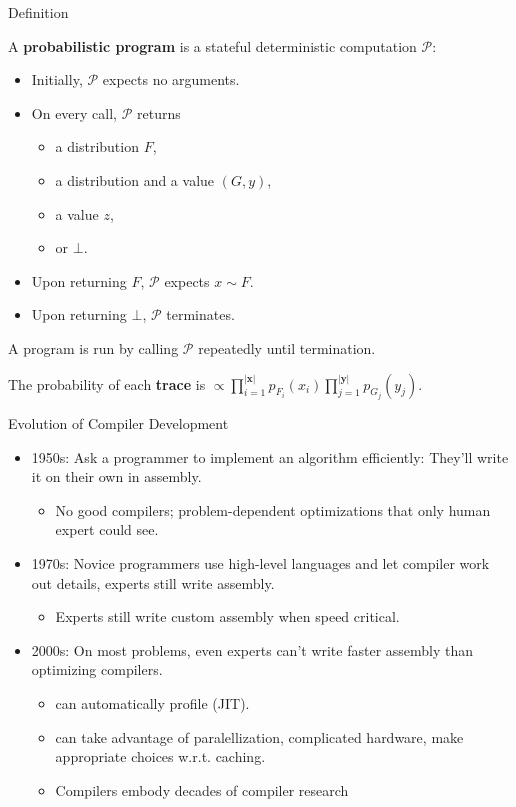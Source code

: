 \documentclass{beamer}
\begin{document}
\begin{frame}{Definition}

A \textbf{probabilistic program} is a stateful deterministic
computation $\mathcal{P}$:
\pause
\begin{itemize}
\item Initially, $\mathcal{P}$ expects no arguments.
    \pause
\item On every call, $\mathcal{P}$ returns
    \begin{itemize}
        \item a distribution $F$,
        \item a distribution and a value $(G, y)$,
        \item a value $z$, 
        \item or $\bot$.
    \end{itemize}
    \pause
\item Upon returning $F$, $\mathcal{P}$ expects $x\sim F$.
    \pause
\item Upon returning $\bot$, $\mathcal{P}$ terminates.
\end{itemize}
\pause
A program is run by calling $\mathcal{P}$ repeatedly until termination.

The probability of each \textbf{trace} is $\propto\prod_{i=1}^{\left|\pmb{x}\right|} p_{F_i}(x_i) \prod_{j=1}^{\left|\pmb{y}\right|}p_{G_j}(y_{j})$.
\end{frame}

\begin{frame}{Evolution of Compiler Development}
    \begin{itemize} 
        \item 1950s: Ask a programmer to implement an algorithm efficiently: They'll write it on their own in assembly.
            \begin{itemize}
                \item   No good compilers; problem-dependent optimizations that only human expert could see.
            \end{itemize}
            \pause
        \item   1970s: Novice programmers use high-level languages and let compiler work out details, experts still write assembly.
            \begin{itemize}
                \item   Experts still write custom assembly when speed critical.
            \end{itemize}
            \pause
        \item   2000s: On most problems, even experts can't write faster assembly than optimizing compilers.
            \begin{itemize}
                \item   can automatically profile (JIT).
                \item   can take advantage of paralellization, complicated hardware, make appropriate choices w.r.t. caching.
                \item   Compilers embody decades of compiler research
            \end{itemize}
    \end{itemize}
\end{frame}
\end{document}
